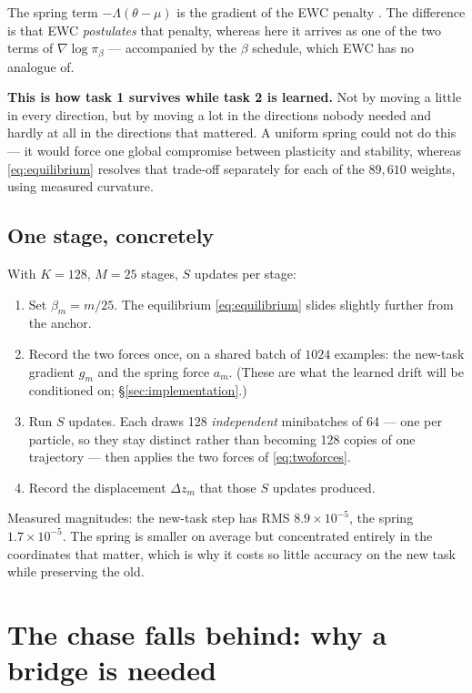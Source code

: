\documentclass[11pt]{article}
\theoremstyle{definition}
\theoremstyle{plain}
\theoremstyle{remark}
\begin{document}
The spring term $-\Lambda(\theta-\mu)$ is the gradient of the EWC penalty
\cite{ewc}. The difference is that EWC \emph{postulates} that penalty, whereas
here it arrives as one of the two terms of $\nabla\log\pi_\beta$ --- accompanied
by the $\beta$ schedule, which EWC has no analogue of.

\textbf{This is how task 1 survives while task 2 is learned.} Not by moving a
little in every direction, but by moving a lot in the directions nobody needed
and hardly at all in the directions that mattered. A uniform spring could not do
this --- it would force one global compromise between plasticity and stability,
whereas \eqref{eq:equilibrium} resolves that trade-off separately for each of
the $89{,}610$ weights, using measured curvature.

\subsection{One stage, concretely}

With $K = 128$, $M = 25$ stages, $S$ updates per stage:

\begin{enumerate}
\item Set $\beta_m = m/25$. The equilibrium \eqref{eq:equilibrium} slides
slightly further from the anchor.
\item Record the two forces once, on a shared batch of $1024$ examples: the
new-task gradient $g_m$ and the spring force $a_m$. (These are what the learned
drift will be conditioned on; \S\ref{sec:implementation}.)
\item Run $S$ updates. Each draws 128 \emph{independent} minibatches of 64 ---
one per particle, so they stay distinct rather than becoming 128 copies of one
trajectory --- then applies the two forces of \eqref{eq:twoforces}.
\item Record the displacement $\Delta z_m$ that those $S$ updates produced.
\end{enumerate}

Measured magnitudes: the new-task step has RMS $8.9\times10^{-5}$, the spring
$1.7\times10^{-5}$. The spring is smaller on average but concentrated entirely
in the coordinates that matter, which is why it costs so little accuracy on the
new task while preserving the old.

\section{The chase falls behind: why a bridge is needed}
\label{sec:lag}
\end{document}
